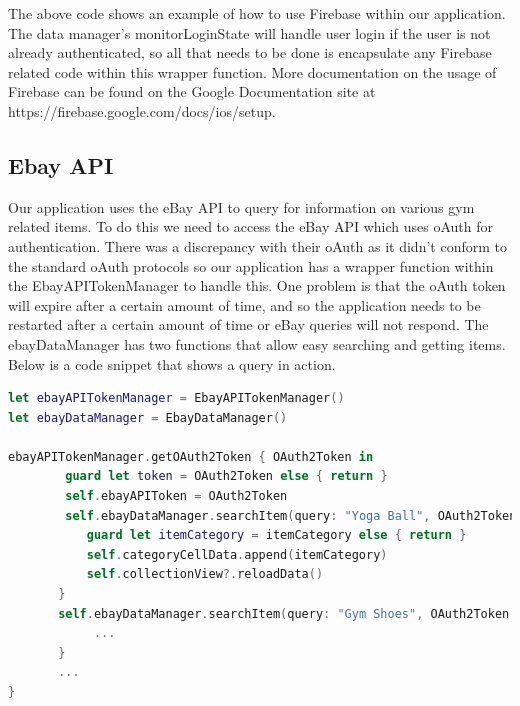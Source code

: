 The above code shows an example of how to use Firebase within our application. The data manager's monitorLoginState will handle user login if the user is not already authenticated, so all that needs to be done is encapsulate any Firebase related code within this wrapper function. More documentation on the usage of Firebase can be found on the Google Documentation site at https://firebase.google.com/docs/ios/setup. \\

\subsection{Ebay API}
Our application uses the eBay API to query for information on various gym related items. To do this we need to access the eBay API which uses oAuth for authentication. There was a discrepancy with their oAuth as it didn't conform to the standard oAuth protocols so our application has a wrapper function within the EbayAPITokenManager to handle this. One problem is that the oAuth token will expire after a certain amount of time, and so the application needs to be restarted after a certain amount of time or eBay queries will not respond. The ebayDataManager has two functions that allow easy searching and getting items. Below is a code snippet that shows a query in action. \\ 

\begin{lstlisting}[language=Swift]
let ebayAPITokenManager = EbayAPITokenManager()
let ebayDataManager = EbayDataManager()

ebayAPITokenManager.getOAuth2Token { OAuth2Token in
        guard let token = OAuth2Token else { return }
        self.ebayAPIToken = OAuth2Token
        self.ebayDataManager.searchItem(query: "Yoga Ball", OAuth2Token: token) { itemCategory in
           guard let itemCategory = itemCategory else { return }
           self.categoryCellData.append(itemCategory)
           self.collectionView?.reloadData()
       }
       self.ebayDataManager.searchItem(query: "Gym Shoes", OAuth2Token: token) { itemCategory in
       		...
       }
       ...
}
\end{lstlisting}
